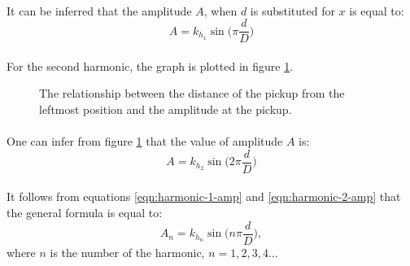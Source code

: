 \documentclass{article}
\begin{document}
\paragraph*{}
It can be inferred that the amplitude $A$, when $d$ is substituted for $x$ is 
equal to:
\begin{equation}
	A = k_{h_1} \sin\Big(\pi \frac{d}{D}\Big)
	\label{eqn:harmonic-1-amp}
\end{equation}

\paragraph*{}
For the second harmonic, the graph is plotted in figure 
\ref{fig:harmonic-2-rel}.
\begin{figure}[ht]
	\centering
	\caption{The relationship between the distance of the pickup from the 
	leftmost position and the amplitude at the pickup.}
	\label{fig:harmonic-2-rel}
\end{figure}

\paragraph*{}
One can infer from figure \ref{fig:harmonic-2-rel} that the value of amplitude 
$A$ is:
\begin{equation}
	A = k_{h_2} \sin\Big(2 \pi \frac{d}{D}\Big)
	\label{eqn:harmonic-2-amp}
\end{equation}

\paragraph*{}
It follows from equations \ref{eqn:harmonic-1-amp} and 
\ref{eqn:harmonic-2-amp} that the general formula is equal to:
\begin{equation}
	A_n = k_{h_n} \sin\Big(n \pi \frac{d}{D}\Big),
	\label{eqn:harmonic-general-amp}
\end{equation}
where $n$ is the number of the harmonic, $n = 1, 2, 3, 4\dots$
\end{document}
